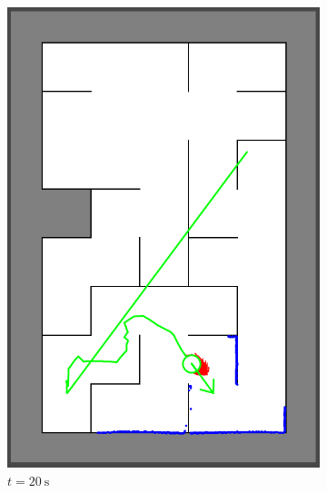 \begin{figure}[H]
\begin{subfigure}{0.2\textwidth}
         \includegraphics[width=\textwidth]{figures/localization2_20s.png}
         \caption{$t = \SI{20}{\second}$}
         \label{mapping20s}
     \end{subfigure}
     \hspace{1em}
     \begin{subfigure}{0.2\textwidth}
         \centering

\end{subfigure}
\end{figure}
